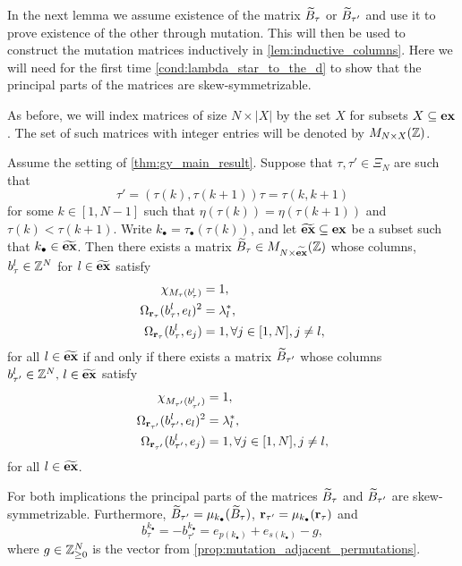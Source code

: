 In the next lemma we assume existence of the matrix $\widetilde{B}_\tau$ or $\widetilde{B}_{\tau'}$ and use
it to prove existence of the other through mutation. This will then be used to
construct the mutation matrices inductively in \cref{lem:inductive_columns}. Here we
will need for the first time \cref{cond:lambda_star_to_the_d} to show that the
principal parts of the matrices are skew-symmetrizable.

As before, we will index matrices of size $N \times |X|$ by the set $X$ for subsets $X
	\subseteq \mathbf{ex}$. The set of such matrices with integer entries will be denoted by $M_{N
			\times X}(\mathbb{Z})$.
\begin{lemma}\label{lem:inductive_step_btautau}
	Assume the setting of \cref{thm:gy_main_result}. Suppose that $\tau, \tau' \in \Xi_N$ are such that
	\begin{equation*}
		\tau' = (\tau(k), \tau(k+1))\tau = \tau(k, k+1)
	\end{equation*}
	for some $k \in [1, N-1]$ such that $\eta(\tau(k)) = \eta(\tau(k+1))$ and $\tau(k) <
		\tau(k+1)$. Write $k_\bullet = \tau_\bullet(\tau(k))$, and let $\widetilde{\mathbf{ex}} \subseteq \mathbf{ex}$
	be a subset such that $k_\bullet \in \widetilde{\mathbf{ex}}$. Then there exists a matrix $\widetilde{B}_{\tau}
		\in M_{N \times \widetilde{\mathbf{ex}}}(\mathbb{Z})$ whose columns, $b^l_{\tau} \in \mathbb{Z}^N$ for $l \in
		\widetilde{\mathbf{ex}}$ satisfy
	\begin{equation}\label{eq:conditions_for_bltautau'}
		\begin{aligned}
			\chi_{M_\tau(b^l_{\tau})}             & = 1,                                \\
			\Omega_{\mathbf{r}_\tau}(b^l_{\tau}, e_l)^2 & = \lambda^*_l,                      \\
			\Omega_{\mathbf{r}_\tau}(b^l_{\tau}, e_j)   & = 1, \forall j \in [1, N], j\neq l,
		\end{aligned}
	\end{equation}
	for all $l \in \widetilde{\mathbf{ex}}$ if and only if there exists a matrix $\widetilde{B}_{\tau'}$ whose
	columns $b^l_{\tau'} \in \mathbb{Z}^N,\,l\in \widetilde{\mathbf{ex}}$ satisfy
	\begin{equation*}
		\begin{aligned}
			\chi_{M_{\tau'}(b^l_{{\tau'}})}             & = 1,                                \\
			\Omega_{\mathbf{r}_{\tau'}}(b^l_{{\tau'}}, e_l)^2 & = \lambda^*_l,                      \\
			\Omega_{\mathbf{r}_{\tau'}}(b^l_{{\tau'}}, e_j)   & = 1, \forall j \in [1, N], j\neq l,
		\end{aligned}
	\end{equation*}
	for all $l \in \widetilde{\mathbf{ex}}$.

	For both implications the principal parts of the matrices $\widetilde{B}_{\tau}$ and
	$\widetilde{B}_{\tau'}$ are skew-symmetrizable. Furthermore, $\widetilde{B}_{\tau'} =
		\mu_{k_\bullet}(\widetilde{B}_{\tau})$, $\mathbf{r}_{\tau'} = \mu_{k_\bullet}(\mathbf{r}_{\tau})$ and
	\begin{equation*}
		b^{k_\bullet}_{\tau} = - b^{k_\bullet}_{\tau'} = e_{p(k_\bullet)} + e_{s(k_\bullet)} - g,
	\end{equation*}
	where $g\in \mathbb{Z}_{\geq 0}^N$ is the vector from
	\cref{prop:mutation_adjacent_permutations}.
\end{lemma}
